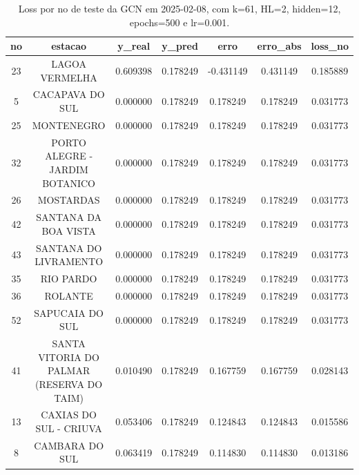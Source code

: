 \begin{table}[h]
\centering
\caption{Loss por no de teste da GCN em 2025-02-08, com k=61, HL=2, hidden=12, epochs=500 e lr=0.001.}
\label{tab:gcn_loss_k61_hl2_h12_e500_d20250208}
\begin{tabular}{ccccccc}
\toprule
no & estacao & y\_real & y\_pred & erro & erro\_abs & loss\_no \\
\midrule
23 & LAGOA VERMELHA & 0.609398 & 0.178249 & -0.431149 & 0.431149 & 0.185889 \\
5 & CACAPAVA DO SUL & 0.000000 & 0.178249 & 0.178249 & 0.178249 & 0.031773 \\
25 & MONTENEGRO & 0.000000 & 0.178249 & 0.178249 & 0.178249 & 0.031773 \\
32 & PORTO ALEGRE - JARDIM BOTANICO & 0.000000 & 0.178249 & 0.178249 & 0.178249 & 0.031773 \\
26 & MOSTARDAS & 0.000000 & 0.178249 & 0.178249 & 0.178249 & 0.031773 \\
42 & SANTANA DA BOA VISTA & 0.000000 & 0.178249 & 0.178249 & 0.178249 & 0.031773 \\
43 & SANTANA DO LIVRAMENTO & 0.000000 & 0.178249 & 0.178249 & 0.178249 & 0.031773 \\
35 & RIO PARDO & 0.000000 & 0.178249 & 0.178249 & 0.178249 & 0.031773 \\
36 & ROLANTE & 0.000000 & 0.178249 & 0.178249 & 0.178249 & 0.031773 \\
52 & SAPUCAIA DO SUL & 0.000000 & 0.178249 & 0.178249 & 0.178249 & 0.031773 \\
41 & SANTA VITORIA DO PALMAR (RESERVA DO TAIM) & 0.010490 & 0.178249 & 0.167759 & 0.167759 & 0.028143 \\
13 & CAXIAS DO SUL - CRIUVA & 0.053406 & 0.178249 & 0.124843 & 0.124843 & 0.015586 \\
8 & CAMBARA DO SUL & 0.063419 & 0.178249 & 0.114830 & 0.114830 & 0.013186 \\
\bottomrule
\end{tabular}
\end{table}
